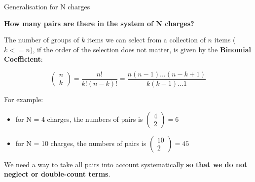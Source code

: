 \vspace{0.2cm}

%
%
%

\begin{frame}{Generalisation for N charges}

{\bf How many pairs are there in the system of N charges?} \\
\vspace{0.2cm}

The number of groups of $k$ items we can select from a collection of $n$ items ($k<=n$),
if the order of the selection does not matter, is given by the {\bf Binomial Coefficient}:

\begin{equation*}
  \left(
    \begin{array}{c}
      n \\
      k
    \end{array}
  \right) =
  \frac{n!}{k!(n-k)!} =
  \frac{n(n-1)...(n-k+1)}{k(k-1)...1}
\end{equation*}

For example:

\begin{itemize}
  \item for N = 4 charges, the numbers of pairs is
        $\left(
          \begin{array}{c}
            4 \\
            2
          \end{array}
        \right) = 6$
  \item for N = 10 charges, the numbers of pairs is
        $\left(
          \begin{array}{c}
           10 \\
            2
          \end{array}
        \right) = 45$
\end{itemize}

We need a way to take all pairs into account systematically
{\bf so that we do not neglect or double-count terms}.

\end{frame}

%
%
%

